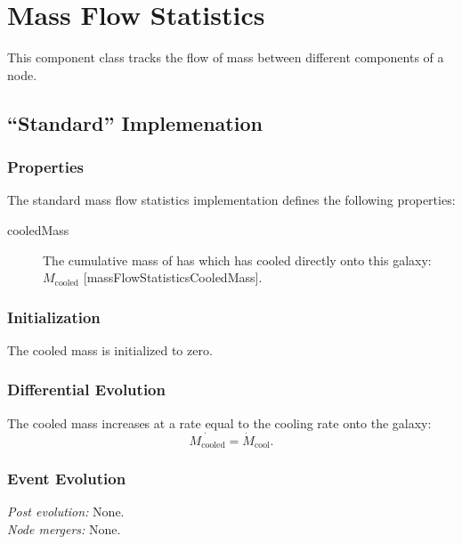 \section{Mass Flow Statistics}

This component class tracks the flow of mass between different components of a \gls{node}.

\subsection{``Standard'' Implemenation}

\subsubsection{Properties}

The standard mass flow statistics implementation defines the following properties:
\begin{description}
 \item [{\normalfont \ttfamily cooledMass}] The cumulative mass of has which has cooled directly onto this galaxy: $M_\mathrm{cooled}$ [{\normalfont \ttfamily massFlowStatisticsCooledMass}].
\end{description}

\subsubsection{Initialization}

The cooled mass is initialized to zero.

\subsubsection{Differential Evolution}

The cooled mass increases at a rate equal to the cooling rate onto the galaxy:
\begin{equation}
  \dot{M_\mathrm{cooled}} = \dot{M}_\mathrm{cool}.
\end{equation}

\subsubsection{Event Evolution}

\noindent\emph{Post evolution:} None.\\

\noindent\emph{Node mergers:} None.\\

